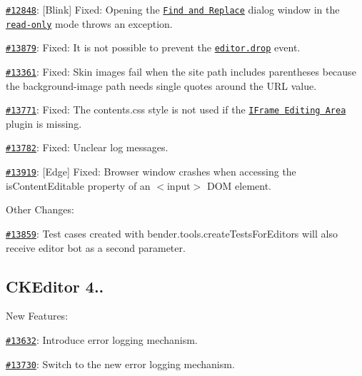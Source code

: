 \begin{DoxyItemize}
\item \href{http://dev.ckeditor.com/ticket/12848}{\tt \#12848}\+: \mbox{[}Blink\mbox{]} Fixed\+: Opening the \href{http://ckeditor.com/addon/find}{\tt Find and Replace} dialog window in the \href{http://docs.ckeditor.com/#!/api/CKEDITOR.editor-property-readOnly}{\tt read-\/only} mode throws an exception.
\item \href{http://dev.ckeditor.com/ticket/13879}{\tt \#13879}\+: Fixed\+: It is not possible to prevent the \href{http://docs.ckeditor.com/#!/api/CKEDITOR.editor-event-drop}{\tt {\ttfamily editor.\+drop}} event.
\item \href{http://dev.ckeditor.com/ticket/13361}{\tt \#13361}\+: Fixed\+: Skin images fail when the site path includes parentheses because the {\ttfamily background-\/image} path needs single quotes around the U\+RL value.
\item \href{http://dev.ckeditor.com/ticket/13771}{\tt \#13771}\+: Fixed\+: The {\ttfamily contents.\+css} style is not used if the \href{http://ckeditor.com/addon/wysiwygarea}{\tt I\+Frame Editing Area} plugin is missing.
\item \href{http://dev.ckeditor.com/ticket/13782}{\tt \#13782}\+: Fixed\+: Unclear log messages.
\item \href{http://dev.ckeditor.com/ticket/13919}{\tt \#13919}\+: \mbox{[}Edge\mbox{]} Fixed\+: Browser window crashes when accessing the {\ttfamily is\+Content\+Editable} property of an {\ttfamily $<$input$>$} D\+OM element.
\end{DoxyItemize}

Other Changes\+:


\begin{DoxyItemize}
\item \href{http://dev.ckeditor.com/ticket/13859}{\tt \#13859}\+: Test cases created with {\ttfamily bender.\+tools.\+create\+Tests\+For\+Editors} will also receive editor bot as a second parameter.
\end{DoxyItemize}

\subsection*{C\+K\+Editor 4..}

New Features\+:


\begin{DoxyItemize}
\item \href{http://dev.ckeditor.com/ticket/13632}{\tt \#13632}\+: Introduce error logging mechanism.
\item \href{http://dev.ckeditor.com/ticket/13730}{\tt \#13730}\+: Switch to the new error logging mechanism.
\end{DoxyItemize}

